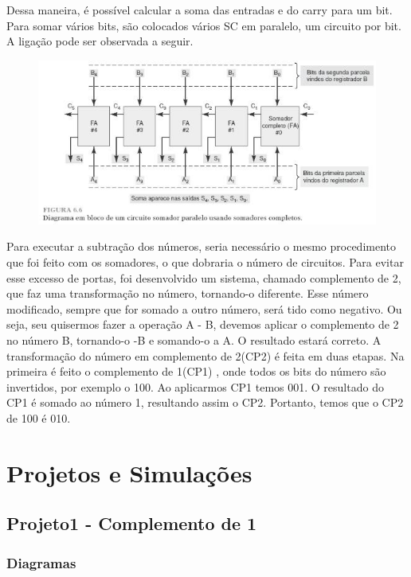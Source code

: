 \documentclass[12pts]{article}
\begin{document}
Dessa maneira, é possível calcular a soma das entradas e do carry para um bit.
Para somar vários bits, são colocados vários SC em paralelo, um circuito por bit. A ligação pode ser observada a seguir.

\begin{figure}[!htb]
  \centering
  \includegraphics[scale=0.6	]{imagens/6}
  \label{figRotulo}
\end{figure}

Para executar a subtração dos números, seria necessário o mesmo procedimento que foi feito com os somadores, o que dobraria o número de circuitos. Para evitar esse excesso de portas, foi desenvolvido um sistema, chamado complemento de 2, que faz uma transformação no número, tornando-o diferente. Esse número modificado, sempre que for somado a outro número, será tido como negativo. Ou seja, seu quisermos fazer a operação A - B, devemos aplicar o complemento de 2 no número B, tornando-o -B e somando-o a A. O resultado estará correto.
A transformação do número em complemento de 2(CP2) é feita em duas etapas. Na primeira é feito o complemento de 1(CP1) , onde todos os bits do número são invertidos, por exemplo o 100. Ao aplicarmos CP1 temos 001. O resultado do CP1 é somado ao número 1, resultando assim o CP2. Portanto, temos que o CP2 de 100 é 010.

\newpage

\section{Projetos e Simulações}
\subsection{Projeto1 - Complemento de 1}
\subsubsection{Diagramas}
\end{document}
